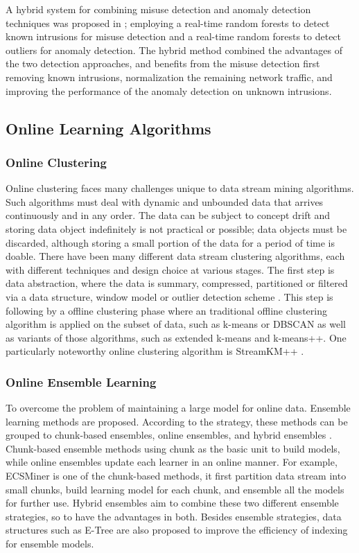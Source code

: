 \documentclass[runningheads]{llncs}
\begin{document}
	A hybrid system for combining misuse detection and anomaly detection techniques was proposed in \cite{Zhang2006}; employing a real-time random forests to detect known intrusions for misuse detection and a real-time random forests to detect outliers for anomaly detection. The hybrid method combined the advantages of the two detection approaches, and benefits from the misuse detection first removing known intrusions, normalization the remaining network traffic, and improving the performance of the anomaly detection on unknown intrusions.
	
	\subsection{Online Learning Algorithms}
	
	\subsubsection{Online Clustering}
	
	Online clustering faces many challenges unique to data stream mining algorithms. Such algorithms must deal with dynamic and unbounded data that arrives continuously and in any order. The data can be subject to concept drift and storing data object indefinitely is not practical or possible; data objects must be discarded, although storing a small portion of the data for a period of time is doable. There have been many different data stream clustering algorithms, each with different techniques and design choice at various stages. The first step is data abstraction, where the data is summary, compressed, partitioned or filtered via a data structure, window model or outlier detection scheme \cite{Silva2013}. This step is following by a offline clustering phase where an traditional offline clustering algorithm is applied on the subset of data, such as k-means or DBSCAN as well as variants of those algorithms, such as extended k-means and k-means++. One particularly noteworthy online clustering algorithm is StreamKM++ \cite{Ackermann2012}. 
	
	\subsubsection{Online Ensemble Learning}
	
	To overcome the problem of maintaining a large model for online data. Ensemble learning methods are proposed. According to the strategy, these methods can be grouped to chunk-based ensembles, online ensembles, and hybrid ensembles \cite{Sun2016}. Chunk-based ensemble methods using chunk as the basic unit to build models, while online ensembles update each learner in an online manner. For example, ECSMiner\cite{Masud2011} is one of the chunk-based methods, it first partition data stream into small chunks, build learning model for each chunk, and ensemble all the models for further use. Hybrid ensembles aim to combine these two different ensemble strategies, so to have the advantages in both. Besides ensemble strategies, data structures such as E-Tree \cite{Zhang2015} are also proposed to improve the efficiency of indexing for ensemble models. 
\end{document}
